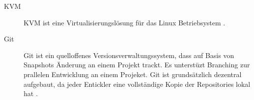 \begin{description}
    \item[KVM] KVM ist eine Virtualisierungslösung für das Linux Betriebsystem \cite{Kivity2007}.
    \item[Git] Git ist ein quelloffenes Versionsverwaltungssystem, dass auf Basis von Snapshots Änderung an einem Projekt trackt. Es unterstüzt Branching zur prallelen Entwicklung an einem Projeket. Git ist grundsätzlich dezentral aufgebaut, da jeder Entickler eine vollständige Kopie der Repositories lokal hat \cite{Scott2014}.
\end{description}
